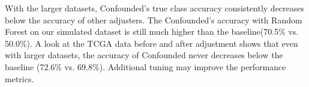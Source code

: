 With the larger datasets, Confounded's true class accuracy consistently decreases below the accuracy of other adjusters.
The Confounded's accuracy with Random Forest on our simulated dataset is still much higher than the baseline(70.5\% vs. 50.0\%). %
A look at the TCGA data before and after adjustment shows that even with larger datasets, the accuracy of Confounded never decreases below the baseline (72.6\% vs. 69.8\%). 
Additional tuning may improve the performance metrics.

